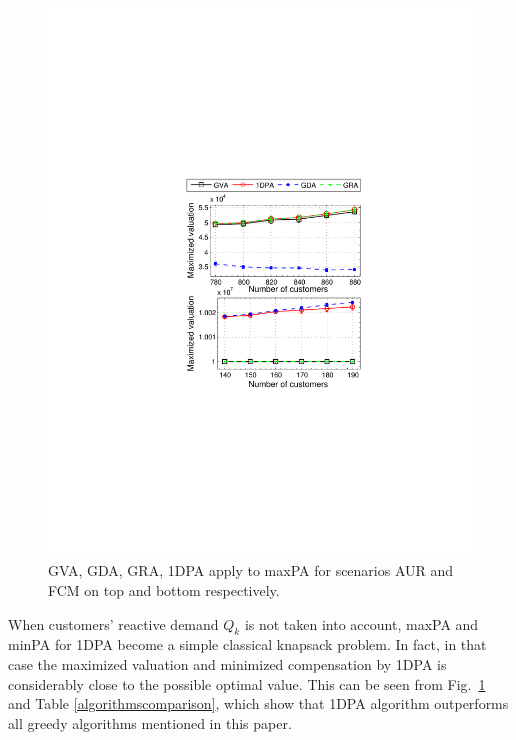 \begin{figure}[!htb]\vspace{-5pt}
	\begin{center}
		\includegraphics[scale=0.7]{fig/4_5.pdf}
	\end{center}\vspace{-5pt}
\caption{{\sc GVA}, {\sc GDA}, {\sc GRA}, {\sc 1DPA} apply to {\sc maxPA} for scenarios AUR and FCM on top and bottom respectively.}
	\label{fig:scenarioaurfcm}
\end{figure} 

 When customers' reactive demand $Q_k$ is not taken into account, {\sc maxPA} and {\sc minPA} for {\sc 1DPA}  become a simple classical knapsack problem. In fact, in that case the maximized valuation and minimized compensation by {\sc 1DPA} is considerably close to the possible optimal value. This can be seen from Fig.~\ref{fig:scenarioaurfcm} and Table \ref{algorithmscomparison}, which show that {\sc 1DPA} algorithm outperforms all greedy algorithms mentioned in this paper.\\

